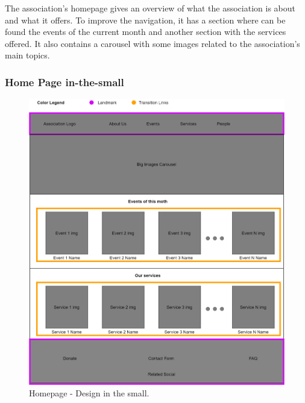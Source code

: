 The association's homepage gives an overview of what the association is about and what it offers. To improve the navigation, it has a section where can be found the events of the current month and another section with the services offered. It also contains a carousel with some images related to the association's main topics.

\subsubsection{Home Page in-the-small}
\begin{figure}[h!]
	\centering
	\begin{minipage}[b]{1\textwidth}
    		\includegraphics[width=\textwidth]{./assets/homepage.png}
		\caption{Homepage - Design in the small.}
	\end{minipage}
\end{figure}
\FloatBarrier

\clearpage

